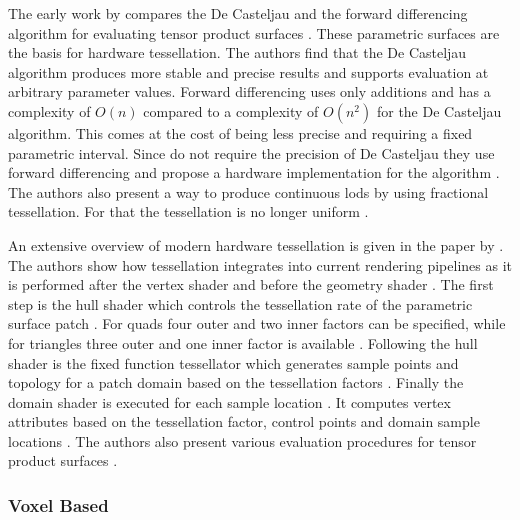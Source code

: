 The early work  by \citeauthor{moreton_tessellation} compares the De Casteljau and the forward differencing algorithm for evaluating tensor product surfaces \cite{moreton_tessellation}.
These parametric surfaces are the basis for hardware tessellation.
The authors find that the De Casteljau algorithm produces more stable and precise results and supports evaluation at arbitrary parameter values.
Forward differencing uses only additions and has a complexity of $O(n)$ compared to a complexity of $O(n^2)$ for the De Casteljau algorithm.
This comes at the cost of being less precise and requiring a fixed parametric interval.
Since \citeauthor{moreton_tessellation} do not require the precision of De Casteljau they use forward differencing and propose a hardware implementation for the algorithm \cite{moreton_tessellation}.
The authors also present a way to produce continuous \acp{lod} by using fractional tessellation.
For that the tessellation is no longer uniform \cite{moreton_tessellation}.

An extensive overview of modern hardware tessellation is given in the paper \cite{niessner_tessellation} by \citeauthor{niessner_tessellation} \cite{niessner_tessellation}.
The authors show how tessellation integrates into current rendering pipelines as it is performed after the vertex shader and before the geometry shader \cite{niessner_tessellation}.
The first step is the hull shader which controls the tessellation rate of the parametric surface patch \cite{niessner_tessellation}.
For quads four outer and two inner factors can be specified, while for triangles three outer and one inner factor is available \cite{niessner_tessellation}.
Following the hull shader is the fixed function tessellator which generates sample points and topology for a patch domain based on the tessellation factors \cite{niessner_tessellation}.
Finally the domain shader is executed for each sample location \cite{niessner_tessellation}.
It computes vertex attributes based on the tessellation factor, control points and domain sample locations \cite{niessner_tessellation}.
The authors also present various evaluation procedures for tensor product surfaces \cite{niessner_tessellation}.

\subsubsection*{Voxel Based}

